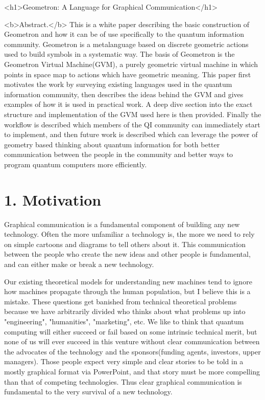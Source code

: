 \documentclass[11pt]{article}
\begin{document}
<h1>Geometron: A Language for Graphical Communication</h1>



    <b>Abstract.</b> 
This is a white paper describing the basic construction of Geometron and how it can be of use specifically to the quantum information community.  Geometron is a metalanguage based on discrete geometric actions used to build symbols in a systematic way.  The basis of Geometron is the Geometron Virtual Machine(GVM), a purely geometric virtual machine in which points in space map to actions which have geometric meaning.  This paper first motivates the work by surveying existing languages used in the quantum information community, then describes the ideas behind the GVM and gives examples of how it is used in practical work.  A deep dive section into the exact structure and implementation of the GVM used here is then provided.  Finally the workflow is described which members of the QI community can immediately start to implement, and then future work is described which can leverage the power of geometry based thinking about quantum information for both better communication between the people in the community and better ways to program quantum computers more efficiently.  



\section{
1. Motivation}




    Graphical communication is a fundamental component of building any new technology.  Often the more unfamiliar a technology is, the more we need to rely on simple cartoons and diagrams to tell others about it.  This communication between the people who create the new ideas and other people is fundamental, and can either make or break a new technology.   




    Our existing theoretical models for understanding new machines tend to ignore how machines propagate through the human population, but I believe this is a mistake.  These questions get banished from technical theoretical problems because we have arbitrarily divided who thinks about what problems up into "engineering", "humanities", "marketing", etc.  We like to think that quantum computing will either succeed or fail based on some intrinsic technical merit, but none of us will ever succeed in this venture without clear communication between the advocates of the technology and the sponsors(funding agents, investors, upper managers).  Those people expect very simple and clear stories to be told in a mostly graphical format via PowerPoint, and that story must be more compelling than that of competing technologies.  Thus clear graphical communication is fundamental to the very survival of a new technology.  
\end{document}

